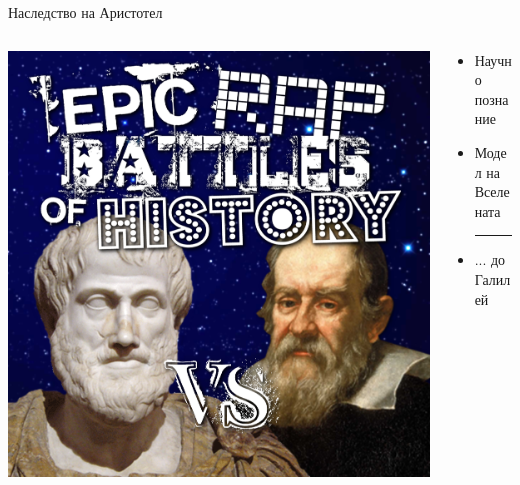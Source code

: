 \documentclass[10pt,a4paper]{beamer}
\begin{document}
        \begin{frame}{ Наследство на Аристотел }
            \begin{columns}
                \begin{column}{0.5\textwidth}
                    \includegraphics[width=\textwidth]{images/aristotel_vs_galiele.png}
                \end{column}
                \begin{column}{0.5\textwidth}
                    \begin{itemize}
                        \item Научно познание
                        \item Модел на Вселената \\
                        \noindent\rule{5cm}{0.5pt}
                        \item ... до Галилей
                    \end{itemize}
                \end{column}
            \end{columns}
        \end{frame}
    
\end{document}
